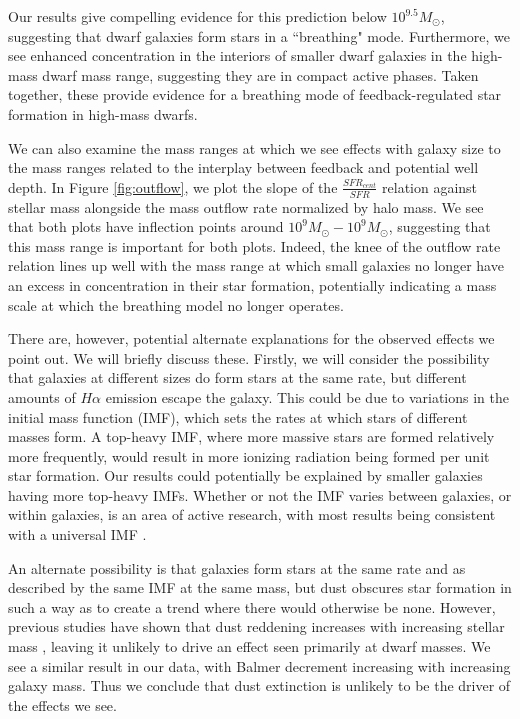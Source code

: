 \documentclass[iop]{emulateapj}
\begin{document}
Our results give compelling evidence for this prediction below $10^{9.5} M_{\odot}$, suggesting that dwarf galaxies form stars in a ``breathing" mode. Furthermore, we see enhanced concentration in the interiors of smaller dwarf galaxies in the high-mass dwarf mass range, suggesting they are in compact active phases. Taken together, these provide evidence for a breathing mode of feedback-regulated star formation in high-mass dwarfs.

We can also examine the mass ranges at which we see effects with galaxy size to the mass ranges related to the interplay between feedback and potential well depth. In Figure \ref{fig:outflow}, we plot the slope of the $\frac{SFR_{cent}}{SFR}$ relation against stellar mass alongside the mass outflow rate normalized by halo mass. We see that both plots have inflection points around $10^{9} M_{\odot}-10^{9} M_{\odot}$, suggesting that this mass range is important for both plots. Indeed, the knee of the outflow rate relation lines up well with the mass range at which small galaxies no longer have an excess in concentration in their star formation, potentially indicating a mass scale at which the breathing model no longer operates.

There are, however, potential alternate explanations for the observed effects we point out. We will briefly discuss these. Firstly, we will consider the possibility that galaxies at different sizes do form stars at the same rate, but different amounts of $H\alpha$ emission escape the galaxy. This could be due to variations in the initial mass function (IMF), which sets the rates at which stars of different masses form. A top-heavy IMF, where more massive stars are formed relatively more frequently, would result in more ionizing radiation being formed per unit star formation. Our results could potentially be explained by smaller galaxies having more top-heavy IMFs. Whether or not the IMF varies between galaxies, or within galaxies, is an area of active research, with most results being consistent with a universal IMF \citep[e.g.,][]{Lee09,Bastian10}. 

An alternate possibility is that galaxies form stars at the same rate and as described by the same IMF at the same mass, but dust obscures star formation in such a way as to create a trend where there would otherwise be none. However, previous studies have shown that dust reddening increases with increasing stellar mass \citep{Garn10}, leaving it unlikely to drive an effect seen primarily at dwarf masses. We see a similar result in our data, with Balmer decrement increasing with increasing galaxy mass. Thus we conclude that dust extinction is unlikely to be the driver of the effects we see.
\end{document}
